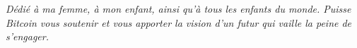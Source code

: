 
\newpage \vspace*{8cm}
\thispagestyle{empty}
\begin{center}
  \Large \emph{
  Dédié à ma femme, à mon enfant, ainsi qu'à tous les enfants du monde. Puisse
  Bitcoin vous soutenir et vous apporter la vision d'un futur qui vaille la
  peine de s'engager.
  }
\end{center}
